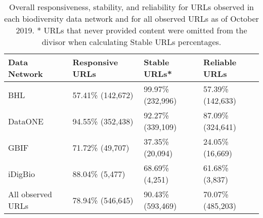 \begin{table}[!ht]
\begin{adjustwidth}{-1.5in}{0in} %
\centering
\begin{tabular}{llll}
\hline
{\bf Data Network} & {\bf Responsive URLs} & {\bf Stable URLs*} & {\bf Reliable URLs} \\ \hline
BHL & 57.41\% (142,672) & 99.97\% (232,996) & 57.39\% (142,633) \\ 
DataONE & 94.55\% (352,438) & 92.27\% (339,109) & 87.09\% (324,641) \\ 
GBIF & 71.72\% (49,707) & 37.35\% (20,094) & 24.05\% (16,669) \\ 
iDigBio & 88.04\% (5,477) & 68.69\% (4,251) & 61.68\% (3,837)  \\ 
All observed URLs & 78.94\% (546,645) & 90.43\% (593,469) & 70.07\% (485,203) \\ \hline
\end{tabular}
\caption{Overall responsiveness, stability, and reliability for URLs observed in each biodiversity data network and for all observed URLs as of October 2019. 
* URLs that never provided content were omitted from the divisor when calculating Stable URLs percentages.
}
\label{table1}
\end{adjustwidth}
\end{table}



